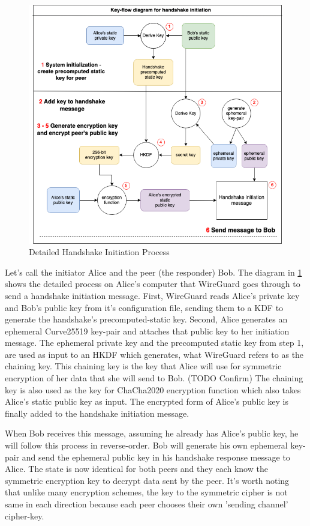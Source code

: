 \documentclass [11pt, proquest] {uwthesis}[2020/02/24]
\begin{document}
\begin{figure}[ht]
\includegraphics[width=15cm]{paper/images/key-flow-wg.drawio.png}
\caption{Detailed Handshake Initiation Process}
\label{fig:keyflow}
\end{figure}

Let's call the initiator Alice and the peer (the responder) Bob.
The diagram in \ref{fig:keyflow} shows the detailed process on Alice's computer that WireGuard goes through to send a handshake initiation message. First, WireGuard reads Alice's private key and Bob's public key from it's configuration file, sending them to a KDF to generate the handshake's precomputed-static key. Second, Alice generates an ephemeral Curve25519 key-pair and attaches that public key to her initiation message. The ephemeral private key and the precomputed static key from step 1, are used as input to an HKDF which generates, what WireGuard refers to as the chaining key. This chaining key is the key that Alice will use for symmetric encryption of her data that she will send to Bob. (TODO Confirm) The chaining key is also used as the key for ChaCha2020 encryption function which also takes Alice's static public key as input. The encrypted form of Alice's public key is finally added to the handshake initiation message.

When Bob receives this message, assuming he already has Alice's public key, he will follow this process in reverse-order. Bob will generate his own ephemeral key-pair and send the ephemeral public key in his handshake response message to Alice. The state is now identical for both peers and they each know the symmetric encryption key to decrypt data sent by the peer. It's worth noting that unlike many encryption schemes, the key to the symmetric cipher is not same in each direction because each peer chooses their own 'sending channel' cipher-key.
\end{document}
